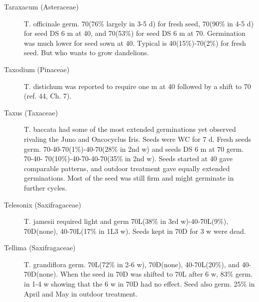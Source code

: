 \begin{description}
\item[Taraxacum (Asteraceae)] T. officinale germ. 70(76\% largely in 3-5 d) for
fresh seed, 70(90\% in 4-5 d) for seed DS 6 m at 40, and 70(53\%) for seed DS 6 m at
70. Germination was much lower for seed sown at 40. Typical is 40(15\%)-70(2\%) for
fresh seed. But who wants to grow dandelions.
\item[Taxodium (Pinaceae)] T. distichum was reported to require one m at 40
followed by a shift to 70 (ref. 44, Ch. 7).
\item[Taxus (Taxaceae)] T. baccata had some of the most extended germinations
yet observed rivaling the Juno and Oncocyclus Iris. Seeds were WC for 7 d. Fresh
seeds germ. 70-40-70(1\%)-40-70(28\% in 2nd w) and seeds DS 6 m at 70 germ. 70-40-
70(10\%)-40-70-40-70(35\% in 2nd w). Seeds started at 40 gave comparable patterns,
and outdoor treatment gave equally extended germinations. Most of the seed was still
firm and might germinate in further cycles.
\item[Telesonix (Saxifragaceae)] T. jamesii required light and germ 70L(38\% in
3rd w)-40-70L(9\%), 70D(none), 40-70L(17\% in 1L3 w). Seeds kept in 70D for 3 w
were dead.
\item[Tellima (Saxifragaceae)] T. grandiflora germ. 70L(72\% in 2-6 w),
70D(none), 40-70L(20\%), and 40-70D(none). When the seed in 70D was shifted to
70L after 6 w, 83\% germ. in 1-4 w showing that the 6 w in 70D had no effect. Seed
also germ. 25\% in April and May in outdoor treatment.


\end{description}
